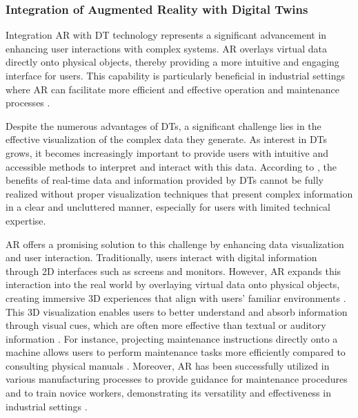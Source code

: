 \subsubsection{Integration of Augmented Reality with Digital Twins} %

Integration \ac{AR} with \ac{DT} technology represents a significant advancement in enhancing user interactions with complex systems. 
\ac{AR} overlays virtual data directly onto physical objects, thereby providing a more intuitive and engaging interface for users. 
This capability is particularly beneficial in industrial settings where \ac{AR} can facilitate more efficient and effective operation and 
maintenance processes \cite{article12, peddie2017augmented}.

Despite the numerous advantages of \ac{DT}s, a significant challenge lies in the effective visualization of the complex data they generate. 
As interest in \ac{DT}s grows, it becomes increasingly important to provide users with intuitive and accessible methods to interpret and interact 
with this data. According to \cite{article12}, the benefits of real-time data and information provided by \ac{DT}s cannot be fully realized without 
proper visualization techniques that present complex information in a clear and uncluttered manner, especially for users with limited technical expertise.

\ac{AR} offers a promising solution to this challenge by enhancing data visualization and user interaction. Traditionally, users interact with digital 
information through 2D interfaces such as screens and monitors. However, \ac{AR} expands this interaction into the real world by overlaying virtual 
data onto physical objects, creating immersive 3D experiences that align with users' familiar environments \cite{peddie2017augmented}. This 3D visualization enables
users to better understand and absorb information through visual cues, which are often more effective than textual or auditory information \cite{article-teaching}.
For instance, projecting maintenance instructions directly onto a machine allows users to perform maintenance tasks more efficiently compared to 
consulting physical manuals \cite{inproceedings}. Moreover, \ac{AR} has been successfully utilized in various manufacturing processes to provide guidance 
for maintenance procedures and to train novice workers, demonstrating its versatility and effectiveness in industrial settings \cite{ong2004virtual}.

